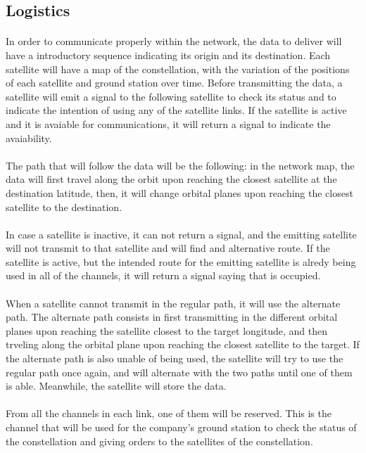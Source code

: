 \documentclass[12pt,a4paper]{article}
\begin{document}
\subsection{Logistics}
\paragraph{}In order to communicate properly within the network, the data to deliver will have a introductory sequence indicating its origin and its destination. Each satellite will have a map of the constellation, with the variation of the positions of each satellite and ground station over time. Before transmitting the data, a satellite will emit a signal to the following satellite to check its status and to indicate the intention of using any of the satellite links. If the satellite is active and it is avaiable for communications, it will return a signal to indicate the avaiability. 

\paragraph{}The path that will follow the data will be the following: in the network map, the data will first travel along the orbit upon reaching the closest satellite at the destination latitude, then, it will change orbital planes upon reaching the closest satellite to the destination.

\paragraph{}In case a satellite is inactive, it can not return a signal, and the emitting satellite will not transmit to that satellite and will find and alternative route. If the satellite is active, but the intended route for the emitting satellite is alredy being used in all of the channels, it will return a signal saying that is occupied.

\paragraph{}When a satellite cannot transmit in the regular path, it will use the alternate path. The alternate path consists in first transmitting in the different orbital planes upon reaching the satellite closest to the target longitude, and then trveling along the orbital plane upon reaching the closest satellite to the target. If the alternate path is also unable of being used, the satellite will try to use the regular path once again, and will alternate with the two paths until one of them is able. Meanwhile, the satellite will store the data.

\paragraph{}From all the channels in each link, one of them will be reserved. This is the channel that will be used for the company's ground station to check the status of the constellation and giving orders to the satellites of the constellation.
\end{document}
